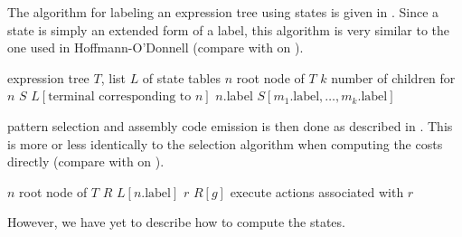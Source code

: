The algorithm for labeling an \gls{expression tree} using \glspl{state} is given
in .
%
Since a \gls{state} is simply an extended form of a label, this algorithm is
very similar to the one used in Hoffmann-O'Donnell (compare with
 on
).
%
\begin{algorithm}[t]
               {expression tree $T$\!, list $L$ of state tables}%
  {%
    $n$ \Assign root node of $T$\;
    $k$ \Assign number of children for $n$\;
    $S$ \Assign $L[\text{terminal corresponding to $n$}]$\;
    $n$.label \Assign $S[m_1.\text{label}, \ldots, m_k.\text{label}]$\;
  }

  \caption[%
            Algorithm for labeling an expression tree using states%
          ]{%
            Labels an expression tree using states%
          }
\end{algorithm}
%
\Gls{pattern selection} and \gls{assembly code} emission is then done as
described in .
%
This is more or less identically to the selection algorithm when computing the
costs directly (compare with  on
).
%
\begin{algorithm}[t]
  {%
    $n$ \Assign root node of $T$\;
    $R$ \Assign $L[n\text{.label}]$\;
    $r$ \Assign $R[g]$\;
    execute actions associated with $r$\;
  }

  \caption[%
            Algorithm for selecting the rules for a labeled expression tree%
          ]%
          {%
            Selects optimal sequence of rules that reduces a given labeled
            expression tree to a given nonterminal%
          }
\end{algorithm}
%
However, we have yet to describe how to compute the \glspl{state}.



